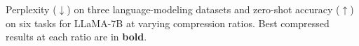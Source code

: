 
\begin{table}[t]
\centering
\footnotesize
\renewcommand{\arraystretch}{1.15}
\setlength{\tabcolsep}{3.2pt}

\caption{Perplexity ($\downarrow$) on three language-modeling datasets and zero-shot accuracy ($\uparrow$) on six tasks for LLaMA-7B at varying compression ratios. Best compressed results at each ratio are in \textbf{bold}.}
\label{tab:main-results}


\end{table}
